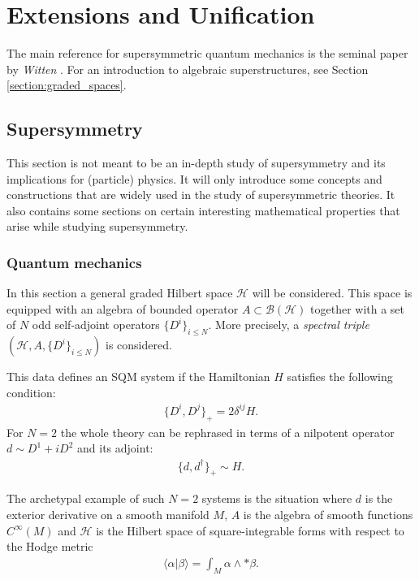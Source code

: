 \chapter{Extensions and Unification}

    The main reference for supersymmetric quantum mechanics is the seminal paper by \textit{Witten} \cite{witten_morse}. For an introduction to algebraic superstructures, see Section \ref{section:graded_spaces}.

\section{Supersymmetry}

    This section is not meant to be an in-depth study of supersymmetry and its implications for (particle) physics. It will only introduce some concepts and constructions that are widely used in the study of supersymmetric theories. It also contains some sections on certain interesting mathematical properties that arise while studying supersymmetry.

\subsection{Quantum mechanics}

    In this section a general graded Hilbert space $\mathcal{H}$ will be considered. This space is equipped with an algebra of bounded operator $A\subset\mathcal{B}(\mathcal{H})$ together with a set of $N$ odd self-adjoint operators $\{D^i\}_{i\leq N}$. More precisely, a \textit{spectral triple} $(\mathcal{H},A,\{D^i\}_{i\leq N})$ is considered.

    This data defines an SQM system if the Hamiltonian $H$ satisfies the following condition:
    \begin{gather}
        \{D^i,D^j\}_+ = 2\delta^{ij}H.
    \end{gather}
    For $N=2$ the whole theory can be rephrased in terms of a nilpotent operator $d\sim D^1+iD^2$ and its adjoint:
    \begin{gather}
        \{d,d^\dagger\}_+\sim H.
    \end{gather}

    \begin{example}
        The archetypal example of such $N=2$ systems is the situation where $d$ is the exterior derivative on a smooth manifold $M$, $A$ is the algebra of smooth functions $C^\infty(M)$ and $\mathcal{H}$ is the Hilbert space of square-integrable forms with respect to the Hodge metric
        \begin{gather}
            \langle\alpha|\beta\rangle = \int_M\alpha\wedge\ast\beta.
        \end{gather}
    \end{example}

